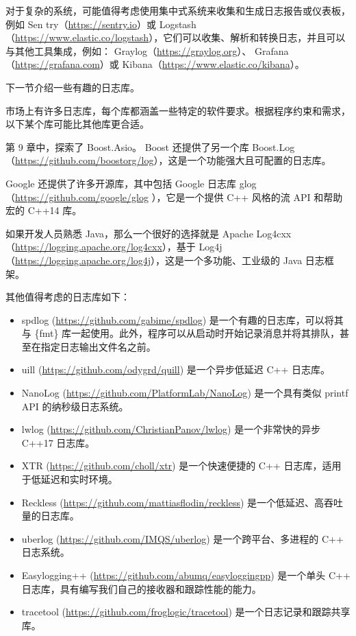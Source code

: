 对于复杂的系统，可能值得考虑使用集中式系统来收集和生成日志报告或仪表板，例如 Sen try（\url{https://sentry.io}）或 Logstash（\url{https://www.elastic.co/logstash}），它们可以收集、解析和转换日志，并且可以与其他工具集成，例如： Graylog（\url{https://graylog.org}）、 Grafana（\url{https://grafana.com}）或 Kibana（\url{https://www.elastic.co/kibana}）。

下一节介绍一些有趣的日志库。


市场上有许多日志库，每个库都涵盖一些特定的软件要求。根据程序约束和需求，以下某个库可能比其他库更合适。

第 9 章中，探索了 Boost.Asio。 Boost 还提供了另一个库 Boost.Log（\url{https://github.com/boostorg/log}），这是一个功能强大且可配置的日志库。

Google 还提供了许多开源库，其中包括 Google 日志库 glog（\url{https://github.com/google/glog} ），它是一个提供 C++ 风格的流 API 和帮助宏的 C++14 库。

如果开发人员熟悉 Java，那么一个很好的选择就是 Apache Log4cxx（\url{https://logging.apache.org/log4cxx}），基于 Log4j（\url{https://logging.apache.org/log4j}），这是一个多功能、工业级的 Java 日志框架。

其他值得考虑的日志库如下：

\begin{itemize}
\item
spdlog (\url{https://github.com/gabime/spdlog}) 是一个有趣的日志库，可以将其与 \{fmt\} 库一起使用。此外，程序可以从启动时开始记录消息并将其排队，甚至在指定日志输出文件名之前。

\item
uill (\url{https://github.com/odygrd/quill}) 是一个异步低延迟 C++ 日志库。

\item
NanoLog (\url{https://github.com/PlatformLab/NanoLog}) 是一个具有类似 printf API 的纳秒级日志系统。

\item
lwlog (\url{https://github.com/ChristianPanov/lwlog}) 是一个非常快的异步 C++17 日志库。

\item
XTR (\url{https://github.com/choll/xtr}) 是一个快速便捷的 C++ 日志库，适用于低延迟和实时环境。

\item
Reckless (\url{https://github.com/mattiasflodin/reckless}) 是一个低延迟、高吞吐量的日志库。

\item
uberlog (\url{https://github.com/IMQS/uberlog}) 是一个跨平台、多进程的 C++ 日志系统。

\item
Easylogging++ (\url{https://github.com/abumq/easyloggingpp}) 是一个单头 C++ 日志库，具有编写我们自己的接收器和跟踪性能的能力。

\item
tracetool (\url{https://github.com/froglogic/tracetool}) 是一个日志记录和跟踪共享库。
\end{itemize}

